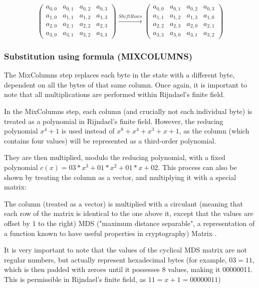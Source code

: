 \documentclass[12pt]{report}
\theoremstyle{definition}
\theoremstyle{remark}
\begin{document}
\[ \left( \begin{array}{cccc}
a_{0,0} & a_{0,1} & a_{0,2} & a_{0,3} \\
a_{1,0} & a_{1,1} & a_{1,2} & a_{1,3} \\
a_{2,0} & a_{2,1} & a_{2,2} & a_{2,3} \\
a_{3,0} & a_{3,1} & a_{3,2} & a_{3,3}\end{array} \right)
\xrightarrow{ShiftRows}
\left( \begin{array}{cccc}
a_{0,0} & a_{0,1} & a_{0,2} & a_{0,3} \\
a_{1,1} & a_{1,2} & a_{1,3} & a_{1,0} \\
a_{2,2} & a_{2,3} & a_{2,0} & a_{2,1} \\
a_{3,3} & a_{3,0} & a_{3,1} & a_{3,2}\end{array} \right)
\]

\subsubsection{Substitution using formula (MIXCOLUMNS)}
The MixColumns step replaces each byte in the state with a different byte, dependent on all the bytes of that same column. Once again, it is important to note that all multiplications are performed within Rijndael's finite field.

In the MixColumns step, each column (and crucially not each individual byte) is treated as a polynomial in Rijndael's finite field. However, the reducing polynomial $x^4+1$ is used instead of $x^8+x^4+x^3+x+1$, as the column (which contains four values) will be represented as a third-order polynomial\cite{Rijndael}.

They are then multiplied, modulo the reducing polynomial, with a fixed polynomial $c(x)=03*x^3+01*x^2+01*x+02$. This process can also be shown by treating the column as a vector, and multiplying it with a special matrix:

The column (treated as a vector) is multiplied with a circulant (meaning that each row of the matrix is identical to the one above it, except that the values are offset by 1 to the right) MDS ("maximum distance separable", a representation of a function known to have useful properties in cryptography) Matrix \cite{MixColumns}.

It is very important to note that the values of the cyclical MDS matrix are not regular numbers, but actually represent hexadecimal bytes (for example, $03 = 11$, which is then padded with zeroes until it possesses 8 values, making it 00000011. This is permissible in Rijndael's finite field, as $11 = x+1 = 00000011$)
\end{document}
